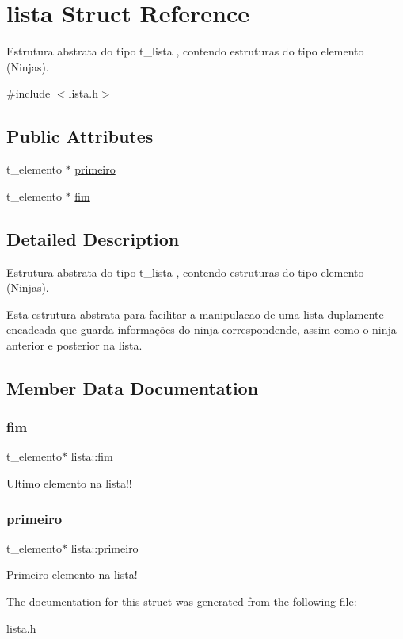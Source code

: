 \hypertarget{structlista}{}\section{lista Struct Reference}
\label{structlista}


Estrutura abstrata do tipo t\+\_\+lista , contendo estruturas do tipo elemento (Ninjas).  




{\ttfamily \#include $<$lista.\+h$>$}

\subsection*{Public Attributes}
\begin{DoxyCompactItemize}
\item 
t\+\_\+elemento $\ast$ \mbox{\hyperlink{structlista_a122645dea0daca41c9392d5439947c0a}{primeiro}}
\item 
t\+\_\+elemento $\ast$ \mbox{\hyperlink{structlista_a176458b08862e25fa77999025ded6528}{fim}}
\end{DoxyCompactItemize}


\subsection{Detailed Description}
Estrutura abstrata do tipo t\+\_\+lista , contendo estruturas do tipo elemento (Ninjas). 

Esta estrutura abstrata para facilitar a manipulacao de uma lista duplamente encadeada que guarda informações do ninja correspondende, assim como o ninja anterior e posterior na lista. 

\subsection{Member Data Documentation}
\mbox{\label{structlista_a176458b08862e25fa77999025ded6528}} 
\subsubsection{\texorpdfstring{fim}{fim}}
{\footnotesize\ttfamily t\+\_\+elemento$\ast$ lista\+::fim}

Ultimo elemento na lista!! \mbox{\label{structlista_a122645dea0daca41c9392d5439947c0a}} 
\subsubsection{\texorpdfstring{primeiro}{primeiro}}
{\footnotesize\ttfamily t\+\_\+elemento$\ast$ lista\+::primeiro}

Primeiro elemento na lista! 

The documentation for this struct was generated from the following file\+:\begin{DoxyCompactItemize}
\item 
lista.\+h\end{DoxyCompactItemize}
